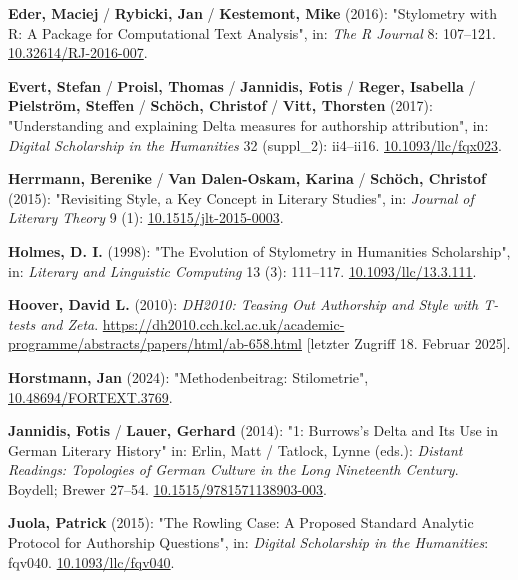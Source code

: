 \documentclass[
  12pt,
  letterpaper,
]{classicthesis}
\newlength{\cslhangindent}
\newenvironment{CSLReferences}[2] %
 {\begin{list}{}{%
  \setlength{\itemindent}{0pt}
  \setlength{\leftmargin}{0pt}
  \setlength{\parsep}{0pt}
  \ifodd #1
   \setlength{\leftmargin}{\cslhangindent}
   \setlength{\itemindent}{-1\cslhangindent}
  \fi
  \setlength{\itemsep}{#2\baselineskip}}}
 {\end{list}}
\begin{document}
\begin{CSLReferences}{1}{0}
\textbf{Eder, Maciej} / \textbf{Rybicki, Jan} / \textbf{Kestemont, Mike}
(2016): "Stylometry with {R}: {A} {Package} for {Computational} {Text}
{Analysis}", in: \emph{The R Journal} 8: 107--121.
\href{https://doi.org/10.32614/RJ-2016-007}{10.32614/RJ-2016-007}.

\textbf{Evert, Stefan} / \textbf{Proisl, Thomas} / \textbf{Jannidis,
Fotis} / \textbf{Reger, Isabella} / \textbf{Pielström, Steffen} /
\textbf{Schöch, Christof} / \textbf{Vitt, Thorsten} (2017):
"Understanding and explaining {Delta} measures for authorship
attribution", in: \emph{Digital Scholarship in the Humanities} 32
(suppl\_2): ii4--ii16.
\href{https://doi.org/10.1093/llc/fqx023}{10.1093/llc/fqx023}.

\textbf{Herrmann, Berenike} / \textbf{Van Dalen-Oskam, Karina} /
\textbf{Schöch, Christof} (2015): "Revisiting {Style}, a {Key} {Concept}
in {Literary} {Studies}", in: \emph{Journal of Literary Theory} 9 (1):
\href{https://doi.org/10.1515/jlt-2015-0003}{10.1515/jlt-2015-0003}.

\textbf{Holmes, D. I.} (1998): "The {Evolution} of {Stylometry} in
{Humanities} {Scholarship}", in: \emph{Literary and Linguistic
Computing} 13 (3): 111--117.
\href{https://doi.org/10.1093/llc/13.3.111}{10.1093/llc/13.3.111}.

\textbf{Hoover, David L.} (2010): \emph{{DH2010}: {Teasing} {Out}
{Authorship} and {Style} with {T}-tests and {Zeta}}.
\url{https://dh2010.cch.kcl.ac.uk/academic-programme/abstracts/papers/html/ab-658.html}
{[}letzter Zugriff 18. Februar 2025{]}.

\textbf{Horstmann, Jan} (2024): "Methodenbeitrag: {Stilometrie}",
\href{https://doi.org/10.48694/FORTEXT.3769}{10.48694/FORTEXT.3769}.

\textbf{Jannidis, Fotis} / \textbf{Lauer, Gerhard} (2014): "1:
{Burrows}'s {Delta} and {Its} {Use} in {German} {Literary} {History}"
in: Erlin, Matt / Tatlock, Lynne (eds.): \emph{Distant {Readings}:
{Topologies} of {German} {Culture} in the {Long} {Nineteenth}
{Century}}. Boydell; Brewer 27--54.
\href{https://doi.org/10.1515/9781571138903-003}{10.1515/9781571138903-003}.

\textbf{Juola, Patrick} (2015): "The {Rowling} {Case}: {A} {Proposed}
{Standard} {Analytic} {Protocol} for {Authorship} {Questions}", in:
\emph{Digital Scholarship in the Humanities}: fqv040.
\href{https://doi.org/10.1093/llc/fqv040}{10.1093/llc/fqv040}.


\end{CSLReferences}
\end{document}
